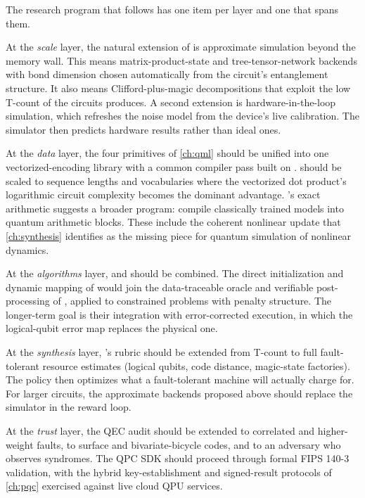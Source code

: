 The research program that follows has one item per layer and one that spans them.

At the \emph{scale} layer, the natural extension of \qgear{} is approximate simulation beyond the memory wall. This means matrix-product-state and tree-tensor-network backends with bond dimension chosen automatically from the circuit's entanglement structure. It also means Clifford-plus-magic decompositions that exploit the low T-count of the circuits \rubriq{} produces. A second extension is hardware-in-the-loop simulation, which refreshes the noise model from the device's live calibration. The simulator then predicts hardware results rather than ideal ones.

At the \emph{data} layer, the four primitives of \cref{ch:qml} should be unified into one vectorized-encoding library with a common compiler pass built on \shardq{}. \vqt{} should be scaled to sequence lengths and vocabularies where the vectorized dot product's logarithmic circuit complexity becomes the dominant advantage. \nnqa's exact arithmetic suggests a broader program: compile classically trained models into quantum arithmetic blocks. These include the coherent nonlinear update that \cref{ch:synthesis} identifies as the missing piece for quantum simulation of nonlinear dynamics.

At the \emph{algorithms} layer, \deal{} and \qawa{} should be combined. The direct initialization and dynamic mapping of \deal{} would join the data-traceable oracle and verifiable post-processing of \qawa{}, applied to constrained problems with penalty structure. The longer-term goal is their integration with error-corrected execution, in which the logical-qubit error map replaces the physical one.

At the \emph{synthesis} layer, \rubriq's rubric should be extended from T-count to full fault-tolerant resource estimates (logical qubits, code distance, magic-state factories). The policy then optimizes what a fault-tolerant machine will actually charge for. For larger circuits, the approximate backends proposed above should replace the simulator in the reward loop.

At the \emph{trust} layer, the QEC audit should be extended to correlated and higher-weight faults, to surface and bivariate-bicycle codes, and to an adversary who observes syndromes. The QPC SDK should proceed through formal FIPS 140-3 validation, with the hybrid key-establishment and signed-result protocols of \cref{ch:pqc} exercised against live cloud QPU services.


